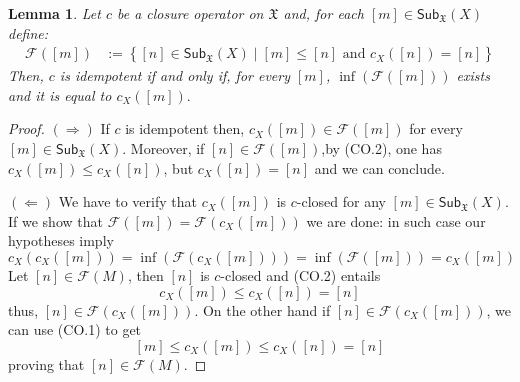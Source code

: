 \documentclass[12pt]{article}
\newtheorem{lemma}{Lemma}[section]
\theoremstyle{definition}
\def\X{\mathfrak X}
\numberwithin{equation}{section}
\newcommand{\catname}[1]{\mathbf{#1}}
\newcommand{\sub}[1]{\mathsf{Sub}_{\catname{#1}}}
\begin{document}
\begin{lemma}\label{char_idem} 
Let $c$ be a closure operator on $\X$ and, for each $[m]\in \sub{\X}(X)$ define:
\begin{align*}
\mathcal{F}([m])&:=\left\{[n]\in  \sub{\X}(X) \mid [m]\leq [n] \text{ and } c_X([n])=[n]\right\}
\end{align*}
Then, $c$ is idempotent if and only if, for every $[m]$, $\inf(\mathcal{F}([m]))$ exists and it is equal to $c_X([m]).$
\end{lemma} 
\begin{proof} $(\Rightarrow)$ If $c$ is idempotent then, $c_X([m])\in \mathcal{F}([m])$ for every $[m]\in \sub{\X}(X)$. Moreover, if $[n]\in \mathcal{F}([m])$,by (CO.2),  one has $c_X([m])\leq c_X([n])$, but $c_X([n])=[n]$ and we can conclude.

\noindent $(\Leftarrow)$ We have to verify that $c_X([m])$ is $c$-closed for any $[m]\in \sub{\X}(X)$. If we show that $\mathcal{F}([m])= \mathcal{F}(c_X([m]))$ we are done: in such case our hypotheses imply
\[c_X(c_X([m]))=\inf(\mathcal{F}(c_X([m])))=\inf(\mathcal{F}([m]))=c_X([m]) \]
Let $[n]\in \mathcal{F}(M)$, then $[n]$ is $c$-closed and (CO.2) entails \[c_X([m])\leq c_X([n])=[n]\]
 thus, $[n]\in \mathcal{F}(c_X([m]))$. On the other hand if $[n]\in \mathcal{F}(c_X([m]))$, we can use (CO.1) to get  
 \[[m]\leq c_X([m])\leq c_X([n])=[n]\]
 proving that $[n]\in \mathcal{F}(M)$.
\end{proof}
\end{document}
